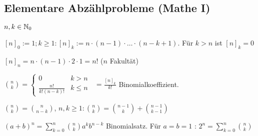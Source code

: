 \subsection*{Elementare Abzählprobleme (Mathe I)}

$n, k \in \operatorname{\mathbb{N}}_0$

$[n]_0 := 1; k \geq 1: [n]_k := n \cdot (n-1) \cdot \dots \cdot (n-k + 1)$.
Für $k > n$ ist $[n]_k=0$

$[n]_n = n \cdot (n-1) \cdot 2 \cdot 1 = n!$ ($n$ Fakultät)

$\binom{n}{k} = \begin{cases}
	0 & k > n \\
	\frac{n!}{k!(n-k)!} & k \leq n
\end{cases} \;\;= \frac{[n]_k}{k!}$ Binomialkoeffizient.

$\binom{n}{k} = \binom{n}{n-k}$, $n, k \geq 1 : \binom{n}{k} = \binom{n-1}{k} + \binom{n-1}{k-1}$

$(a+b)^n = \sum_{k=0}^{n}\binom{n}{k}a^kb^{n-k} $ Binomialsatz.
\; Für $a=b=1$ : $ 2^n = \sum_{k=0}^{n}\binom{n}{k}  $ 
































